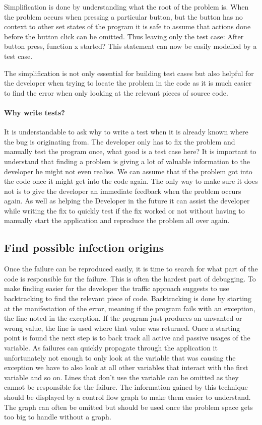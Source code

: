 Simplification is done by understanding what the root of the problem is. When the problem occurs when pressing a particular button, but the button has no context to other set states of the program it is safe to assume that actions done before the button click can be omitted. Thus leaving only the test case: After button press, function x started? This statement can now be easily modelled by a test case.

The simplification is not only essential for building test cases but also helpful for the developer when trying to locate the problem in the code as it is much easier to find the error when only looking at the relevant pieces of source code.

\paragraph{Why write tests?}
It is understandable to ask why to write a test when it is already known where the bug is originating from. The developer only has to fix the problem and manually test the program once, what good is a test case here?
It is important to understand that finding a problem is giving a lot of valuable information to the developer he might not even realise. We can assume that if the problem got into the code once it might get into the code again. The only way to make sure it does not is to give the developer an immediate feedback when the problem occurs again. As well as helping the Developer in the future it can assist the developer while writing the fix to quickly test if the fix worked or not without having to manually start the application and reproduce the problem all over again.



\subsection{Find possible infection origins}
Once the failure can be reproduced easily, it is time to search for what part of the code is responsible for the failure. This is often the hardest part of debugging. To make finding easier for the developer the traffic approach suggests to use backtracking to find the relevant piece of code. Backtracking is done by starting at the manifestation of the error, meaning if the program fails with an exception, the line noted in the exception. If the program just produces an unwanted or wrong value, the line is used where that value was returned. Once a starting point is found the next step is to back track all active and passive usages of the variable. As failures can quickly propagate through the application it unfortunately not enough to only look at the variable that was causing the exception we have to also look at all other variables that interact with the first variable and so on. Lines that don't use the variable can be omitted as they cannot be responsible for the failure.  The information gained by this technique should be displayed by a control flow graph to make them easier to understand. The graph can often be omitted but should be used once the problem space gets too big to handle without a graph.

